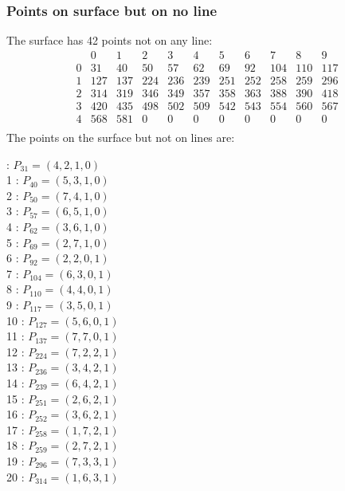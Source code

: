 \documentclass{article}
\begin{document}
{\subsubsection*{Points on surface but on no line}
The surface has 42 points not on any line:\\
$$
\begin{array}{r|*{10}{r}}
 & 0 & 1 & 2 & 3 & 4 & 5 & 6 & 7 & 8 & 9\\
\hline
0 & 31 & 40 & 50 & 57 & 62 & 69 & 92 & 104 & 110 & 117\\
1 & 127 & 137 & 224 & 236 & 239 & 251 & 252 & 258 & 259 & 296\\
2 & 314 & 319 & 346 & 349 & 357 & 358 & 363 & 388 & 390 & 418\\
3 & 420 & 435 & 498 & 502 & 509 & 542 & 543 & 554 & 560 & 567\\
4 & 568 & 581 & 0 & 0 & 0 & 0 & 0 & 0 & 0 & 0\\
\end{array}
$$
The points on the surface but not on lines are:\\
\begin{multicols}{2}
 : $P_{31}=( 4, 2, 1, 0 )$\\
1 : $P_{40}=( 5, 3, 1, 0 )$\\
2 : $P_{50}=( 7, 4, 1, 0 )$\\
3 : $P_{57}=( 6, 5, 1, 0 )$\\
4 : $P_{62}=( 3, 6, 1, 0 )$\\
5 : $P_{69}=( 2, 7, 1, 0 )$\\
6 : $P_{92}=( 2, 2, 0, 1 )$\\
7 : $P_{104}=( 6, 3, 0, 1 )$\\
8 : $P_{110}=( 4, 4, 0, 1 )$\\
9 : $P_{117}=( 3, 5, 0, 1 )$\\
10 : $P_{127}=( 5, 6, 0, 1 )$\\
11 : $P_{137}=( 7, 7, 0, 1 )$\\
12 : $P_{224}=( 7, 2, 2, 1 )$\\
13 : $P_{236}=( 3, 4, 2, 1 )$\\
14 : $P_{239}=( 6, 4, 2, 1 )$\\
15 : $P_{251}=( 2, 6, 2, 1 )$\\
16 : $P_{252}=( 3, 6, 2, 1 )$\\
17 : $P_{258}=( 1, 7, 2, 1 )$\\
18 : $P_{259}=( 2, 7, 2, 1 )$\\
19 : $P_{296}=( 7, 3, 3, 1 )$\\
20 : $P_{314}=( 1, 6, 3, 1 )$\\

\end{multicols}}
\end{document}
